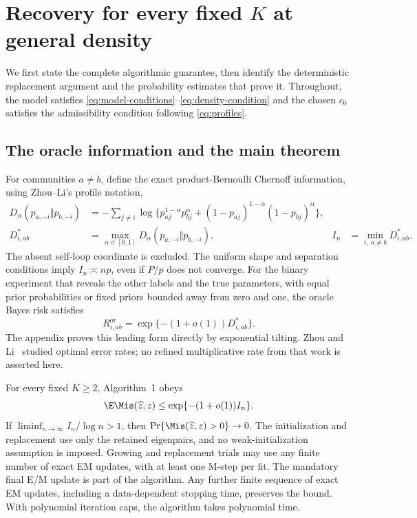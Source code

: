 \section{Recovery for every fixed \texorpdfstring{$K$}{K} at general density}
\label{sec:main-results}

We first state the complete algorithmic guarantee, then identify the deterministic replacement argument and the probability estimates that prove it. Throughout, the model satisfies \eqref{eq:model-conditions}--\eqref{eq:density-condition} and the chosen $c_0$ satisfies the admissibility condition following \eqref{eq:profiles}.

\subsection{The oracle information and the main theorem}
For communities $a\ne b$, define the exact product-Bernoulli Chernoff information, using Zhou--Li's profile notation,
\begin{align}
 D_\alpha(p_{a,-i}\Vert p_{b,-i})
  &=-\sum_{j\ne i}\log\{p_{aj}^{1-\alpha}p_{bj}^{\alpha}
           +(1-p_{aj})^{1-\alpha}(1-p_{bj})^{\alpha}\},
  \label{eq:chernoff-information}\\
 D^*_{i,ab}&=\max_{\alpha\in[0,1]}
                 D_\alpha(p_{a,-i}\Vert p_{b,-i}),
 &I_n&=\min_{i,\ a\ne b}D^*_{i,ab}.
 \label{eq:exact-information}
\end{align}
The absent self-loop coordinate is excluded. The uniform shape and separation conditions imply $I_n\asymp np$, even if $P/p$ does not converge. For the binary experiment that reveals the other labels and the true parameters, with equal prior probabilities or fixed priors bounded away from zero and one, the oracle Bayes risk satisfies
\begin{equation}
 R_{i,ab}^{\mathrm{or}}=\exp\{-(1+o(1))D^*_{i,ab}\}.
 \label{eq:oracle-risk}
\end{equation}
The appendix proves this leading form directly by exponential tilting. Zhou and Li~\citep{zhouli2020} studied optimal error rates; no refined multiplicative rate from that work is asserted here.

\begin{theorem}
\label{thm:main-recovery}
For every fixed $K\ge2$, Algorithm~1 obeys
\begin{equation}
 \E\Mis(\widehat z,z)\le\exp\{-(1+o(1))I_n\}.
 \label{eq:main-rate}
\end{equation}
If $\liminf_{n\to\infty}I_n/\log n>1$, then
$\Pr\{\Mis(\widehat z,z)>0\}\to0$.
The initialization and replacement use only the retained eigenpairs, and no weak-initialization assumption is imposed. Growing and replacement trials may use any finite number of exact EM updates, with at least one M-step per fit. The mandatory final E/M update is part of the algorithm. Any further finite sequence of exact EM updates, including a data-dependent stopping time, preserves the bound. With polynomial iteration caps, the algorithm takes polynomial time.
\end{theorem}

